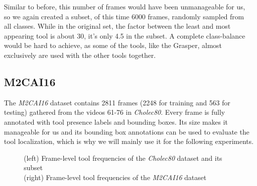 Similar to before, this number of frames would have been unmanageable for us, so we again created a subset, of this time 6000 frames, randomly sampled from all classes. While in the original set, the factor between the least and most appearing tool is about 30, it's only 4.5 in the subset. A complete class-balance would be hard to achieve, as some of the tools, like the Grasper, almost exclusively are used with the other tools together.


\subsection{M2CAI16}

The \emph{M2CAI16} dataset contains \num{2811} frames (\num{2248} for training and \num{563} for testing) gathered from the videos 61-76 in \emph{Cholec80}. Every frame is fully annotated with tool presence labels and bounding boxes. Its size makes it manageable for us and its bounding box annotations can be used to evaluate the tool localization, which is why we will mainly use it for the following experiments.


\begin{figure}[h]
	\caption{(left) Frame-level tool frequencies of the \emph{Cholec80} dataset and its subset \\(right) Frame-level tool frequencies of the \emph{M2CAI16} dataset}
\end{figure}
